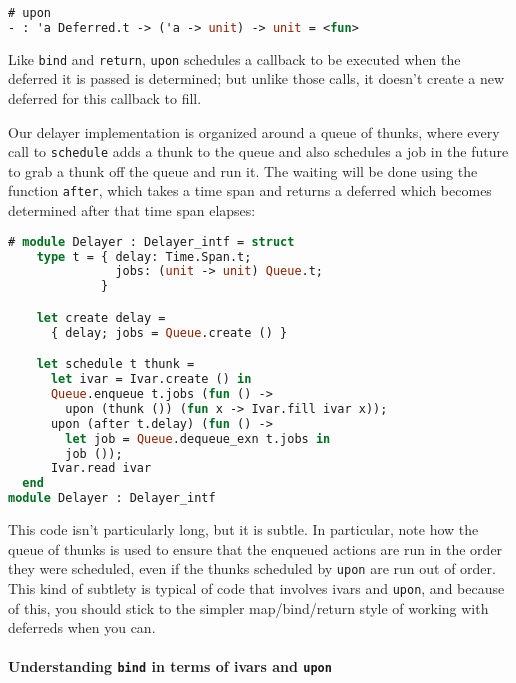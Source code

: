 \begin{lstlisting}[language=Caml]
# upon
- : 'a Deferred.t -> ('a -> unit) -> unit = <fun>
\end{lstlisting}

Like \passthrough{\lstinline!bind!} and
\passthrough{\lstinline!return!}, \passthrough{\lstinline!upon!}
schedules a callback to be executed when the deferred it is passed is
determined; but unlike those calls, it doesn't create a new deferred for
this callback to fill.

Our delayer implementation is organized around a queue of thunks, where
every call to \passthrough{\lstinline!schedule!} adds a thunk to the
queue and also schedules a job in the future to grab a thunk off the
queue and run it. The waiting will be done using the function
\passthrough{\lstinline!after!}, which takes a time span and returns a
deferred which becomes determined after that time span elapses:

\begin{lstlisting}[language=Caml]
# module Delayer : Delayer_intf = struct
    type t = { delay: Time.Span.t;
               jobs: (unit -> unit) Queue.t;
             }

    let create delay =
      { delay; jobs = Queue.create () }

    let schedule t thunk =
      let ivar = Ivar.create () in
      Queue.enqueue t.jobs (fun () ->
        upon (thunk ()) (fun x -> Ivar.fill ivar x));
      upon (after t.delay) (fun () ->
        let job = Queue.dequeue_exn t.jobs in
        job ());
      Ivar.read ivar
  end
module Delayer : Delayer_intf
\end{lstlisting}

This code isn't particularly long, but it is subtle. In particular, note
how the queue of thunks is used to ensure that the enqueued actions are
run in the order they were scheduled, even if the thunks scheduled by
\passthrough{\lstinline!upon!} are run out of order. This kind of
subtlety is typical of code that involves ivars and
\passthrough{\lstinline!upon!}, and because of this, you should stick to
the simpler map/bind/return style of working with deferreds when you
can.~

\hypertarget{understanding-bind-in-terms-of-ivars-and-upon}{%
\paragraph{\texorpdfstring{Understanding \texttt{bind} in terms of ivars
and
\texttt{upon}}{Understanding bind in terms of ivars and upon}}\label{understanding-bind-in-terms-of-ivars-and-upon}}

